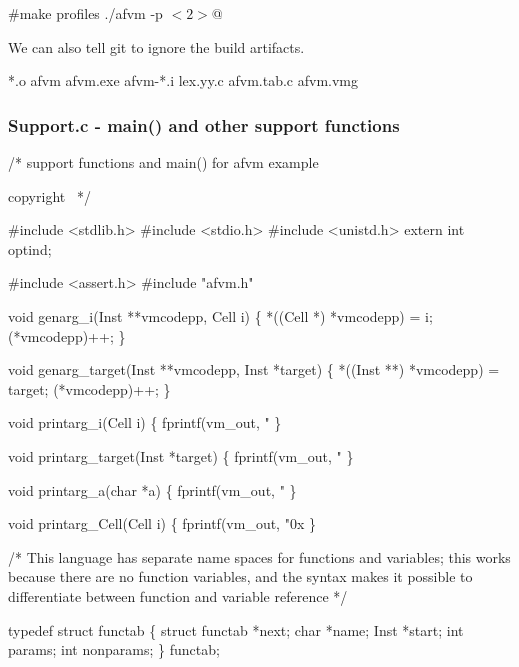 \documentclass[10pt,english]{article}
\begin{document}
#make profiles
        ./afvm -p $< 2>$@
\nwendcode{}\nwdocspar

We can also tell git to ignore the build artifacts.

\nwenddocs{}\endmoddef
*.o
afvm
afvm.exe
afvm-*.i
lex.yy.c
afvm.tab.c
afvm.vmg
\nwendcode{}\nwdocspar


\subsubsection{Support.c - main() and other support functions\label{sub:Support.c---main()}}

\nwenddocs{}\endmoddef
/* support functions and main() for afvm example

\LA{}copyright~{\nwtagstyle{}}\RA{}
*/

#include <stdlib.h>
#include <stdio.h>
#include <unistd.h>
extern int optind;

#include <assert.h>
#include "afvm.h"

void genarg_i(Inst **vmcodepp, Cell i)
\{
  *((Cell *) *vmcodepp) = i;
  (*vmcodepp)++;
\}

void genarg_target(Inst **vmcodepp, Inst *target)
\{
  *((Inst **) *vmcodepp) = target;
  (*vmcodepp)++;
\}

void printarg_i(Cell i)
\{
  fprintf(vm_out, "%
\}

void printarg_target(Inst *target)
\{
  fprintf(vm_out, "%
\}

void printarg_a(char *a)
\{
  fprintf(vm_out, "%
\}

void printarg_Cell(Cell i)
\{
  fprintf(vm_out, "0x%
\}

/* This language has separate name spaces for functions and variables;
   this works because there are no function variables, and the syntax
   makes it possible to differentiate between function and variable
   reference */

typedef struct functab \{
  struct functab *next;
  char *name;
  Inst *start;
  int params;
  int nonparams;
\} functab;
\end{document}
